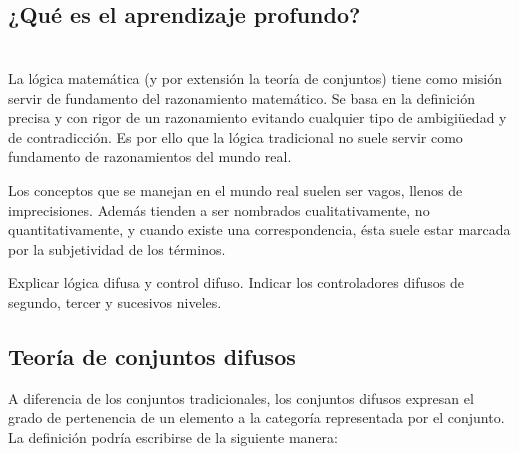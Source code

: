 \subsection{¿Qué es el aprendizaje profundo?}

\section{}


La lógica matemática (y por extensión la teoría de conjuntos) tiene como misión servir de fundamento del razonamiento matemático. Se basa en la definición precisa y con rigor de un razonamiento evitando cualquier tipo de ambigiüedad y de contradicción. Es por ello que la lógica tradicional no suele servir como fundamento de razonamientos del mundo real.

Los conceptos que se manejan en el mundo real suelen ser vagos, llenos de imprecisiones. Además tienden a ser nombrados cualitativamente, no quantitativamente, y cuando existe una correspondencia, ésta suele estar marcada por la subjetividad de los términos.

Explicar lógica difusa y control difuso. Indicar los controladores difusos de segundo, tercer y sucesivos niveles.

\subsection{Teoría de conjuntos difusos}

A diferencia de los conjuntos tradicionales, los conjuntos difusos expresan el grado de pertenencia de un elemento a la categoría representada por el conjunto. La definición podría escribirse de la siguiente manera:


